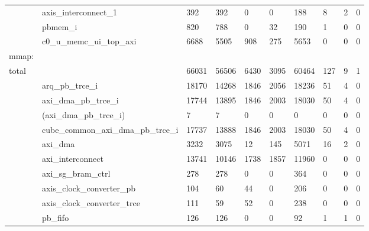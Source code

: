 \begin{table}
\begin{center}
\begin{tabular}{llllllllll}
&      axis\_interconnect\_1                            &        392 &        392 &       0 &    0 &   188 &      8 &      2 &          0 \\
&      pbmem\_i                                        &        820 &        788 &       0 &   32 &   190 &      1 &      0 &          0 \\
&    c0\_u\_memc\_ui\_top\_axi                            &       6688 &       5505 &     908 &  275 &  5653 &      0 &      0 &          0 \\
\midrule
mmap: \\
  total                                        & &      66031 &      56506 &    6430 & 3095 & 60464 &    127 &      9 &          1 \\
&   arq\_pb\_trce\_i                                      &      18170 &      14268 &    1846 & 2056 & 18236 &     51 &      4 &          0 \\
&     axi\_dma\_pb\_trce\_i                                &      17744 &      13895 &    1846 & 2003 & 18030 &     50 &      4 &          0 \\
&       (axi\_dma\_pb\_trce\_i)                            &          7 &          7 &       0 &    0 &     0 &      0 &      0 &          0 \\
&       cube\_common\_axi\_dma\_pb\_trce\_i                  &      17737 &      13888 &    1846 & 2003 & 18030 &     50 &      4 &          0 \\
&         axi\_dma                                      &       3232 &       3075 &      12 &  145 &  5071 &     16 &      2 &          0 \\
&         axi\_interconnect                             &      13741 &      10146 &    1738 & 1857 & 11960 &      0 &      0 &          0 \\
&         axi\_sg\_bram\_ctrl                             &        278 &        278 &       0 &    0 &   364 &      0 &      0 &          0 \\
&         axis\_clock\_converter\_pb                      &        104 &         60 &      44 &    0 &   206 &      0 &      0 &          0 \\
&         axis\_clock\_converter\_trce                    &        111 &         59 &      52 &    0 &   238 &      0 &      0 &          0 \\
&         pb\_fifo                                      &        126 &        126 &       0 &    0 &    92 &      1 &      1 &          0 \\

\end{tabular}
\end{center}
\end{table}
